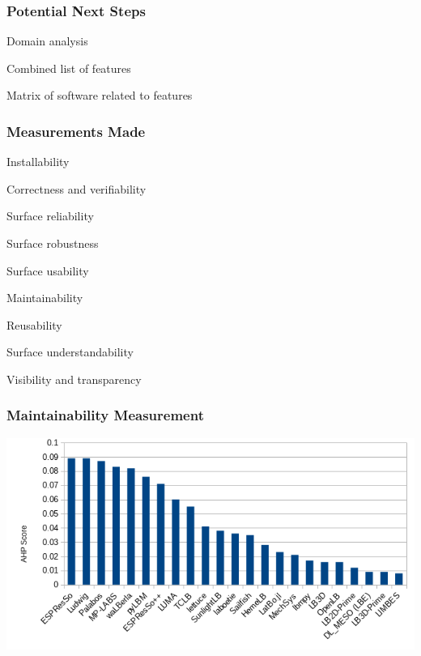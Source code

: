 \documentclass[t,12pt,numbers,fleqn]{beamer}
\begin{document}

\begin{frame}
\frametitle{Potential Next Steps}

\bi
\item {}
  \bi
\item Domain analysis
\item Combined list of features
\item Matrix of software related to features \ei \ei

\end{frame}

\begin{frame}
\frametitle{Measurements Made}

\be
\item Installability
\item Correctness and verifiability
\item Surface reliability
\item Surface robustness
\item Surface usability
\item Maintainability
\item Reusability
\item Surface understandability
\item Visibility and transparency
 \ee
  
\end{frame}


\begin{frame}
\frametitle{Maintainability Measurement}

\bigskip

    \includegraphics[width=1.0\textwidth]{maintainability_chart.png}


    
\end{frame}
\end{document}
